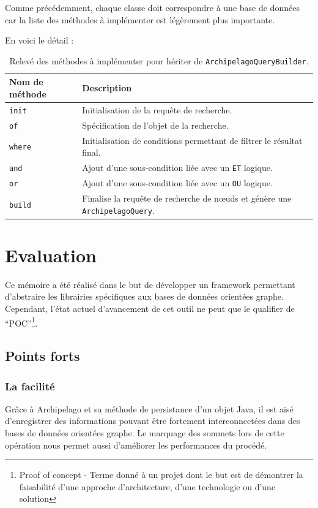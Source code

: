 \documentclass[a4paper,fleqn,12pt,oneside]{report}
\begin{document}
Comme précédemment, chaque classe doit correspondre à une base de données car la liste des méthodes à implémenter est légèrement plus importante.

En voici le détail :
\begin{table}[ht!]
\centering
\begin{tabular}[c]{|l|M{12cm}|}

\hline
\textbf{Nom de méthode} & \textbf{Description}  \tabularnewline
\hline
\texttt{init} & Initialisation de la requête de recherche.  \tabularnewline
\hline
\texttt{of} & Spécification de l'objet de la recherche.  \tabularnewline
\hline
\texttt{where} & Initialisation de conditions permettant de filtrer le résultat final.  \tabularnewline
\hline
\texttt{and} & Ajout d'une sous-condition liée avec un \texttt{ET} logique. \tabularnewline
\hline
\texttt{or} & Ajout d'une sous-condition liée avec un \texttt{OU} logique.   \tabularnewline
\hline
\texttt{build} & Finalise la requête de recherche de nœuds et génère une \texttt{ArchipelagoQuery}.   \tabularnewline \hline

\end{tabular}
\caption{Relevé des méthodes à implémenter pour hériter de \texttt{ArchipelagoQueryBuilder}.}
\label{tab:ArchipelagoQueryBuilder}
\end{table}


\chapter{Evaluation}

Ce mémoire a été réalisé dans le but de développer un framework permettant d'abstraire les librairies spécifiques aux bases de données orientées graphe. Cependant, l'état actuel d'avancement de cet outil ne peut que le qualifier de \enquote{POC}\footnote{Proof of concept - Terme donné à un projet dont le but est de démontrer la faisabilité d'une approche d'architecture, d'une technologie ou d'une solution }.


\section{Points forts}

\subsection{La facilité}

Grâce à Archipelago et sa méthode de persistance d'un objet Java, il est aisé d'enregistrer des informations pouvant être fortement interconnectées dans des bases de données orientées graphe. 
Le marquage des sommets lors de cette opération nous permet aussi d'améliorer les performances du procédé. 
\end{document}
